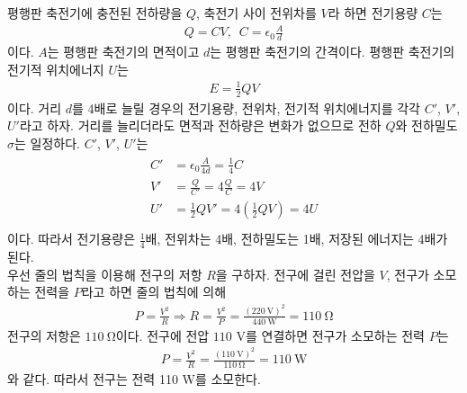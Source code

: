 \documentclass[tightenlines,floatfix,nofootinbib,superscriptaddress,fleqn]{revtex4}
\begin{document}
평행판 축전기에 충전된 전하량을 $Q$, 축전기 사이 전위차를 $V$라 하면 전기용량 $C$는
\begin{align}
  Q = CV,\,\,\,C = \epsilon_0\frac{A}{d}
\end{align}
이다. $A$는 평행판 축전기의 면적이고 $d$는 평행판 축전기의 간격이다. 평행판 축전기의 전기적
위치에너지 $U$는
\begin{align}
  E = \frac{1}{2}QV
\end{align}
이다. 거리 $d$를 4배로 늘릴 경우의 전기용량, 전위차, 전기적 위치에너지를 각각 $C'$, 
$V'$, $U'$라고 하자. 거리를 늘리더라도 면적과 전하량은 변화가 없으므로 전하 $Q$와 
전하밀도 $\sigma$는 일정하다. $C'$, $V'$, $U'$는
\begin{align}
  \begin{split}
    C'& = \epsilon_0\frac{A}{4d} = \frac{1}{4}C \\
    V'& = \frac{Q}{C'} = 4\frac{Q}{C} = 4V \\
    U'& = \frac{1}{2}QV' = 4\left(\frac{1}{2}QV\right) = 4U\\ 
  \end{split}
\end{align}
이다. 따라서 전기용량은 $\frac{1}{4}$배, 전위차는 4배, 전하밀도는 1배, 저장된 에너지는 4배가
된다.
\\

우선 줄의 법칙을 이용해 전구의 저항 $R$을 구하자. 전구에 걸린 전압을 $V$, 전구가 소모하는 
전력을 $P$라고 하면 줄의 법칙에 의해
\begin{align}
  P = \frac{V^2}{R} \Longrightarrow R = \frac{V^2}{P} 
  = \frac{(220~\mathrm{V})^2}{440~\mathrm{W}} = 110~\mathrm{\Omega}
\end{align}
전구의 저항은 $110~\mathrm{\Omega}$이다.
전구에 전압 $110$ V를 연결하면 전구가 소모하는 전력 $P$는
\begin{align}
  P = \frac{V^2}{R} = \frac{(110~\mathrm{V})^2}{110~\mathrm{\Omega}}
  =110~\mathrm{W}
\end{align}
와 같다. 따라서 전구는 전력 110 W를 소모한다.
\\
\end{document}
